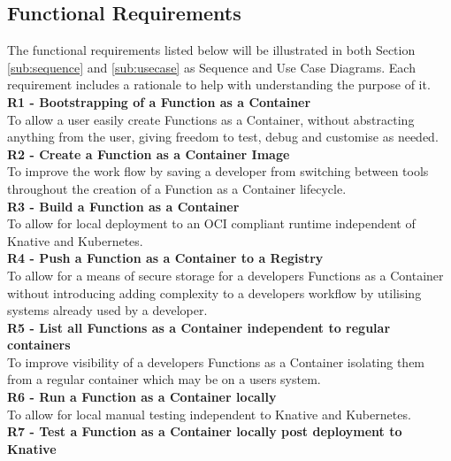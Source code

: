 \subsection{Functional Requirements}
The functional requirements listed below will be illustrated in both Section \ref{sub:sequence} and \ref{sub:usecase} as Sequence and Use Case Diagrams. Each requirement includes a rationale to help with understanding the purpose of it.
\newline
\\\textbf{R1 - Bootstrapping of a Function as a Container}
\label{req:r1}
\\ To allow a user easily create Functions as a Container, without abstracting anything from the user, giving freedom to test, debug and customise as needed.
\newline
\\\textbf{R2 - Create a Function as a Container Image}
\label{sub:r2}
\\ To improve the work flow by saving a developer from switching between tools throughout the creation of a Function as a Container lifecycle.
\newline
\\\textbf{R3 - Build a Function as a Container}
\label{req:r3}
\\ To allow for local deployment to an OCI compliant runtime independent of Knative and Kubernetes.
\newline
\\\textbf{R4 - Push a Function as a Container to a Registry}
\label{req:r4}
\\ To allow for a means of secure storage for a developers Functions as a Container without introducing adding complexity to a developers workflow by utilising systems already used by a developer.
\newline
\\\textbf{R5 - List all Functions as a Container independent to regular containers}
\label{req:r5}
\\ To improve visibility of a developers Functions as a Container isolating them from a regular container which may be on a users system.
\newline
\\\textbf{R6 - Run a Function as a Container locally}
\label{req:r6}
\\ To allow for local manual testing independent to Knative and Kubernetes.
\newline
\\\textbf{R7 - Test a Function as a Container locally post deployment to Knative}
